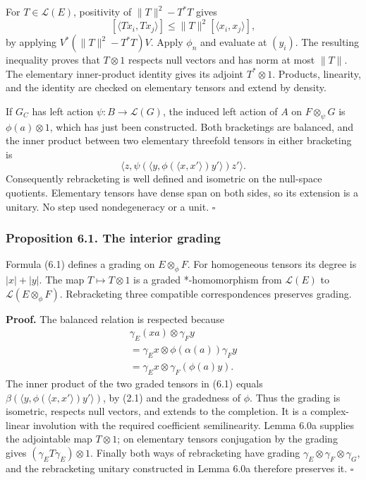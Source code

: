 \documentclass[
  11pt,
]{article}
\begin{document}
For \(T\in\mathcal L(E)\), positivity of \(\|T\|^2-T^*T\) gives \[
[\langle Tx_i,Tx_j\rangle]
\leq\|T\|^2[\langle x_i,x_j\rangle],
\] by applying \(V^*(\|T\|^2-T^*T)V\). Apply \(\phi_n\) and evaluate at
\((y_i)\). The resulting inequality proves that \(T\otimes1\) respects
null vectors and has norm at most \(\|T\|\). The elementary
inner-product identity gives its adjoint \(T^*\otimes1\). Products,
linearity, and the identity are checked on elementary tensors and extend
by density.

If \(G_C\) has left action \(\psi:B\to\mathcal L(G)\), the induced left
action of \(A\) on \(F\otimes_\psi G\) is \(\phi(a)\otimes1\), which has
just been constructed. Both bracketings are balanced, and the inner
product between two elementary threefold tensors in either bracketing is
\[
\langle z,\psi(\langle y,\phi(\langle x,x'\rangle)y'\rangle)z'\rangle.
\] Consequently rebracketing is well defined and isometric on the
null-space quotients. Elementary tensors have dense span on both sides,
so its extension is a unitary. No step used nondegeneracy or a unit.
\(\square\)

\subsubsection{Proposition 6.1. The interior
grading}\label{proposition-6.1.-the-interior-grading}

Formula (6.1) defines a grading on \(E\otimes_\phi F\). For homogeneous
tensors its degree is \(|x|+|y|\). The map \(T\mapsto T\otimes1\) is a
graded *-homomorphism from \(\mathcal L(E)\) to
\(\mathcal L(E\otimes_\phi F)\). Rebracketing three compatible
correspondences preserves grading.

\textbf{Proof.} The balanced relation is respected because \[
\begin{gathered}
\gamma_E(xa)\otimes\gamma_Fy
\\=\gamma_Ex\otimes\phi(\alpha(a))\gamma_Fy
\\=\gamma_Ex\otimes\gamma_F(\phi(a)y).
\end{gathered}
\] The inner product of the two graded tensors in (6.1) equals
\(\beta(\langle y,\phi(\langle x,x'\rangle)y'\rangle)\), by (2.1) and
the gradedness of \(\phi\). Thus the grading is isometric, respects null
vectors, and extends to the completion. It is a complex-linear
involution with the required coefficient semilinearity. Lemma 6.0a
supplies the adjointable map \(T\otimes1\); on elementary tensors
conjugation by the grading gives \((\gamma_ET\gamma_E)\otimes1\).
Finally both ways of rebracketing have grading
\(\gamma_E\otimes\gamma_F\otimes\gamma_G\), and the rebracketing unitary
constructed in Lemma 6.0a therefore preserves it. \(\square\)
\end{document}
